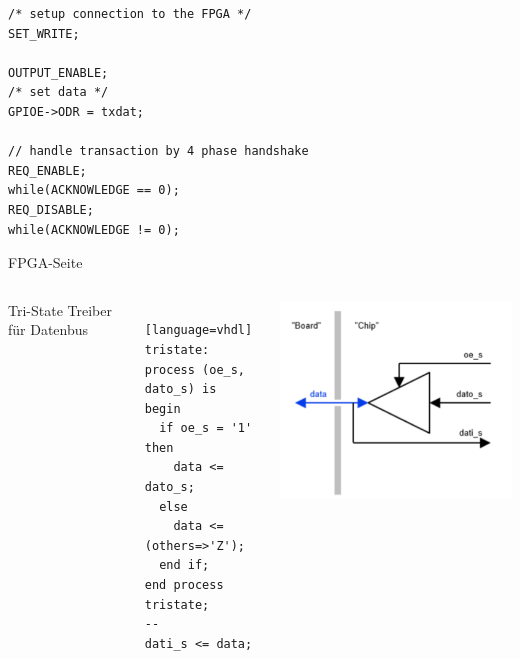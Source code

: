 \documentclass[aspectratio=169,presentation]{beamer}
\begin{document}
\begin{frame} [fragile]
  \begin{lstlisting}
/* setup connection to the FPGA */
SET_WRITE;

OUTPUT_ENABLE;
/* set data */
GPIOE->ODR = txdat;

// handle transaction by 4 phase handshake
REQ_ENABLE;
while(ACKNOWLEDGE == 0);
REQ_DISABLE;
while(ACKNOWLEDGE != 0);
  \end{lstlisting}
\end{frame}


\begin{frame} [fragile] {FPGA-Seite}
  \begin{columns}
      Tri-State Treiber für Datenbus
      \begin{lstlisting} [language=vhdl]
tristate:
process (oe_s, dato_s) is
begin
  if oe_s = '1' then
    data <= dato_s;
  else
    data <= (others=>'Z');
  end if;
end process tristate;
--
dati_s <= data;
      \end{lstlisting}
      \includegraphics[width=\textwidth]{figs/tristate-treiber.png}
  \end{columns}
\end{frame}
\end{document}
